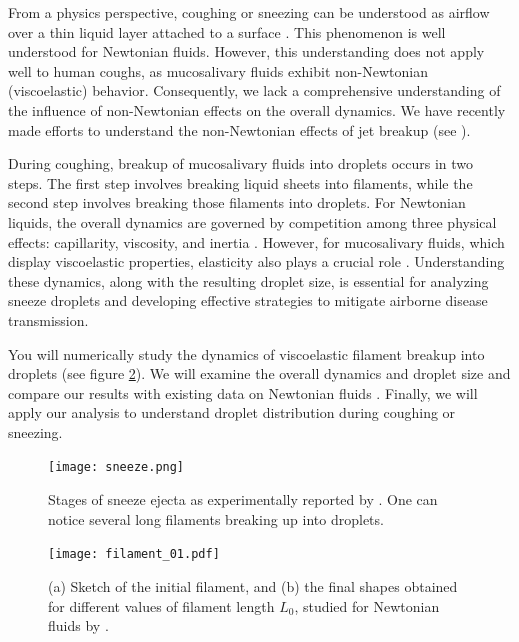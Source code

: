\documentclass[11pt]{article}
\begin{document}
From a physics perspective, coughing or sneezing can be understood as airflow over a thin liquid layer attached to a surface \citep{kant2023bag}. This phenomenon is well understood for Newtonian fluids. However, this understanding does not apply well to human coughs, as mucosalivary fluids exhibit non-Newtonian (viscoelastic) behavior. Consequently, we lack a comprehensive understanding of the influence of non-Newtonian effects on the overall dynamics. We have recently made efforts to understand the non-Newtonian effects of jet breakup (see \citet{dixit2024viscoelastic}).

During coughing, breakup of mucosalivary fluids into droplets occurs in two steps. The first step involves breaking liquid sheets into filaments, while the second step involves breaking those filaments into droplets. For Newtonian liquids, the overall dynamics are governed by competition among three physical effects: capillarity, viscosity, and inertia \citep{anthony2019dynamics}. However, for mucosalivary fluids, which display viscoelastic properties, elasticity also plays a crucial role \citep{sen2021retraction, liu2022contraction}. Understanding these dynamics, along with the resulting droplet size, is essential for analyzing sneeze droplets and developing effective strategies to mitigate airborne disease transmission.

You will numerically study the dynamics of viscoelastic filament breakup into droplets (see figure \ref{fig:filament}). We will examine the overall dynamics and droplet size and compare our results with existing data on Newtonian fluids \citep{anthony2019dynamics}. Finally, we will apply our analysis to understand droplet distribution during coughing or sneezing. 


\begin{figure}[H]
\begin{center}
 \texttt{[image: sneeze.png]}
 \caption{Stages of sneeze ejecta as experimentally reported by \citet{scharfman2016visualization}. One can notice several long filaments breaking up into droplets.}
 \label{Figure::Typical}
\end{center}
\end{figure}

\begin{figure}[H]
	\begin{center}
		\texttt{[image: filament\_01.pdf]}
		\caption{(a) Sketch of the initial filament, and (b) the final shapes obtained for different values of filament length $L_0$, studied for Newtonian fluids by \citet{anthony2019dynamics}. }
		\label{fig:filament}
	\end{center}
\end{figure}
\end{document}
